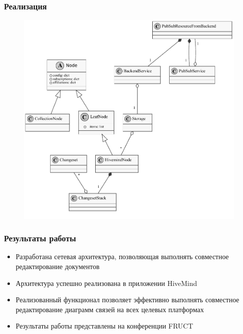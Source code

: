 \documentclass[unicode]{beamer}
\begin{document}
\begin{frame}
\transwipe[direction=90]
\frametitle{Реализация}
\begin{figure}[h!] 
\centering
\includegraphics[scale=0.5]{idavoll-classes} 
\end{figure}
\end{frame}

\begin{frame}
\transwipe[direction=90]
\frametitle{Результаты работы}
\begin{itemize}
  \item Разработана сетевая архитектура, позволяющая выполнять совместное
  редактирование документов
  \item Архитектура успешно реализована в приложении HiveMind
  \item Реализованный функционал позволяет эффективно выполнять совместное
  редактирование диаграмм связей на всех целевых платформах
  \item Результаты работы представлены на конференции FRUCT
\end{itemize}
\end{frame}
\end{document}
